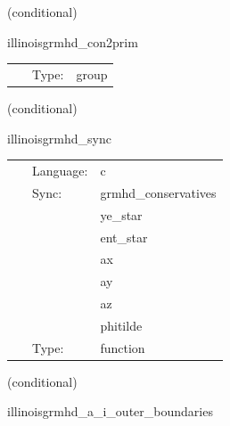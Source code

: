 \documentclass{article}
\begin{document}
\vspace{5mm}

   (conditional) 

\hspace{5mm} illinoisgrmhd\_con2prim 

\hspace{5mm}{\it compute primitive variables from conservatives } 


\hspace{5mm}

 \begin{tabular*}{160mm}{cll} 
~ & Type:  & group \\ 
\end{tabular*} 


\vspace{5mm}

   (conditional) 

\hspace{5mm} illinoisgrmhd\_sync 

\hspace{5mm}{\it sync conservative variable ghost zones for c2p routine } 


\hspace{5mm}

 \begin{tabular*}{160mm}{cll} 
~ & Language:  & c \\ 
~ & Sync:  & grmhd\_conservatives \\ 
~& ~ &ye\_star\\ 
~& ~ &ent\_star\\ 
~& ~ &ax\\ 
~& ~ &ay\\ 
~& ~ &az\\ 
~& ~ &phitilde\\ 
~ & Type:  & function \\ 
\end{tabular*} 


\vspace{5mm}

   (conditional) 

\hspace{5mm} illinoisgrmhd\_a\_i\_outer\_boundaries 



\hspace{5mm}
\end{document}
